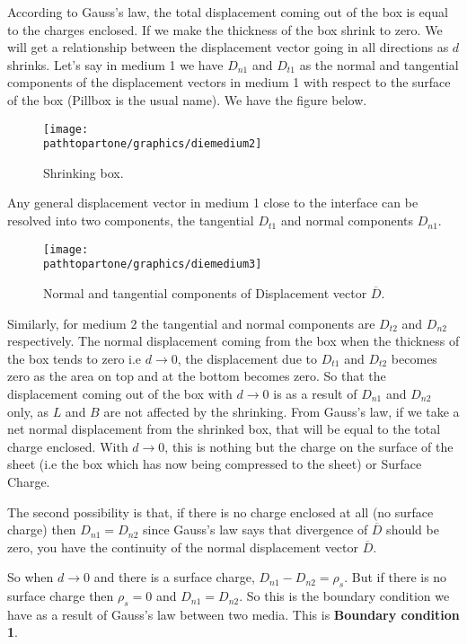 According to Gauss's law, the total displacement coming out of the box is equal to the charges enclosed. If we make the thickness of the box shrink to zero. We will get a relationship between the displacement vector going in all directions as $d$ shrinks.  Let's say in medium 1 we have $D_{n1}$ and $D_{t1}$ as the normal and tangential components of the displacement vectors in medium 1 with respect to the surface of the box (Pillbox is the usual name). We have the figure below.
\begin{figure}[h]
\centering
\texttt{[image: \\pathtopartone/graphics/diemedium2]}
\caption{Shrinking box.}
\end{figure}

Any general displacement vector in medium 1 close to the interface can be resolved into two components, the tangential $D_{t1}$ and normal components $D_{n1}$. 
\begin{figure}[h]
\centering
\texttt{[image: \\pathtopartone/graphics/diemedium3]}
\caption{Normal and tangential components of Displacement vector $\overline{D}$.}
\end{figure}
Similarly, for medium 2 the tangential and normal components are $D_{t2}$ and $D_{n2}$ respectively. The normal displacement coming from the box when the thickness of the box tends to zero i.e $d \longrightarrow 0$, the displacement due to $D_{t1}$ and $D_{t2}$ becomes zero as the area on top and at the bottom becomes zero. So that the displacement coming out of the box with $d \longrightarrow 0$ is as a result of $D_{n1}$ and $D_{n2}$ only, as $L$ and $B$ are not affected by the shrinking. From Gauss's law, if we take a net normal displacement from the shrinked box, that will be equal to the total charge enclosed. With $d \longrightarrow 0$, this is nothing but the charge on the surface of the sheet (i.e the box which has now being compressed to the sheet) or Surface Charge.

The second possibility is that, if there is no charge enclosed at all (no surface charge) then $D_{n1}= D_{n2}$ since Gauss's law says that divergence of $\overline{D}$ should be zero, you have the continuity of the normal displacement vector $\overline{D}$.

So when 
$d \longrightarrow 0$ and there is a surface charge, $D_{n1}- D_{n2} = \rho_s$. But if there is no surface charge then $\rho_s = 0$ and $D_{n1}= D_{n2}$. So this is the boundary condition we have as a result of Gauss's law between two media. This is \textbf{Boundary condition 1}.


